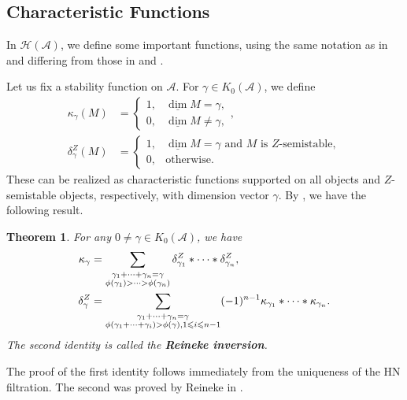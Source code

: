 \documentclass[a4paper,12pt]{amsart}
\newtheorem{theorem}{Theorem}[section]
\newcommand{\udv}{\underline{\dim}}
\begin{document}
\subsection{Characteristic Functions}
In $\mathcal{H}(\mathcal{A})$, we define some important functions, using the same notation as in \cite{BT2012} and differing from those in \cite{Rei2002} and \cite{WC2023}.

Let us fix a stability function on $\mathcal{A}$. For $\gamma\in K_0(\mathcal{A})$, we define
\begin{align*}
    \kappa_\gamma(M)&=\begin{cases}
        1,&\udv M=\gamma,\\
        0,&\udv M\neq\gamma,
    \end{cases},\\
    \delta^Z_\gamma(M)&=\begin{cases}
        1,&\udv M=\gamma\text{ and $M$ is $Z$-semistable},\\
        0,&\text{otherwise}.
    \end{cases}
\end{align*}
These can be realized as characteristic functions supported on all objects and $Z$-semistable objects, respectively, with dimension vector $\gamma$. By \cite{Rei2002}, we have the following result.
\begin{theorem}\label{reciprocity}
For any $0\neq\gamma\in K_0(\mathcal{A})$, we have
    \begin{align*}
    \kappa_\gamma&=\sum_{\begin{subarray}{c}
        \\ \gamma_1+\dots+\gamma_n=\gamma\\
        \phi(\gamma_1)>\dots>\phi(\gamma_n)
        \end{subarray}}\delta^Z_{\gamma_1}*\dots*\delta^Z_{\gamma_n},\\
    \delta^Z_\gamma&=\sum_{\begin{subarray}{c}
        \\ \gamma_1+\dots+\gamma_n=\gamma\\
        \phi(\gamma_1+\dots+\gamma_i)>\phi(\gamma),1\leqslant i\leqslant n-1
        \end{subarray}}(-1)^{n-1}\kappa_{\gamma_1}*\dots*\kappa_{\gamma_n}.
    \end{align*}
    The second identity is called the \textbf{Reineke inversion}.
\end{theorem}
    The proof of the first identity follows immediately from the uniqueness of the HN filtration. The second was proved by Reineke in \cite{Rei2002}.   
    
\end{document}
